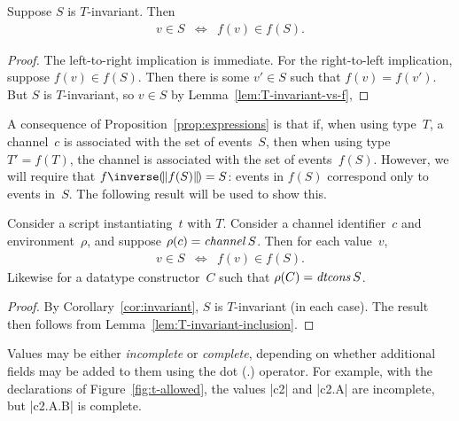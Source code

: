 %
\begin{lemma}
\label{lem:T-invariant-inclusion}
Suppose $S$ is $T$-invariant.  Then 
%
\begin{eqnarray*}
v \in S & \iff & f(v) \in f(S).
\end{eqnarray*}
\end{lemma}


\begin{proof}
The left-to-right implication is immediate.  For the right-to-left
implication, suppose $f(v) \in f(S)$.  Then there is some $v' \in S$ such that
$f(v) = f(v')$.  But $S$ is $T$-invariant, so $v \in S$ by
Lemma~\ref{lem:T-invariant-vs-f}, 
\end{proof}



A consequence of Proposition~\ref{prop:expressions} is that if, when using
type~$T$, a channel~$c$ is associated with the set of events~$S$, then when
using type $T' = f(T)$, the channel is associated with the set of
events~$f(S)$.  However, we will require that $f\inverse\banana{f(S)} = S$:
events in $f(S)$ correspond only to events in~$S$.  The following result will
be used to show this.
%
\begin{corollary}
\label{cor:channel-types}
Consider a script instantiating~$t$ with $T$.  Consider a channel
identifier~$c$ and environment~$\rho$, and suppose $\rho(c) = \mathop{\it channel} S$.
Then for each value~$v$,
\begin{eqnarray*}
v \in S & \iff & f(v) \in f(S).
\end{eqnarray*}
%
Likewise for a datatype constructor~$C$ such that $\rho(C) = \mathop{\it dtcons} S$. 
\end{corollary}

\begin{proof}
By Corollary~\ref{cor:invariant}, $S$ is $T$-invariant (in each case).  The
result then follows from Lemma~\ref{lem:T-invariant-inclusion}.
\end{proof}


Values may be either \emph{incomplete} or \emph{complete}, depending on
whether additional fields may be added to them using the dot ($.$) operator.
For example, with the declarations of Figure~\ref{fig:t-allowed}, the values
|c2| and |c2.A| are incomplete, but |c2.A.B| is complete.  

